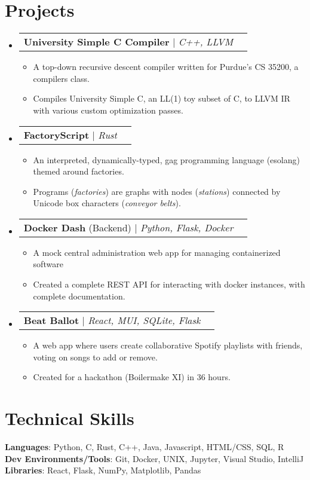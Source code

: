 \documentclass[letterpaper,11pt]{article}
\makeatletter
\newcommand{\resumeItem}[1]{
    \item\small{
        {#1 \vspace{-2pt}}
    }
}
\newcommand{\resumeProjectHeading}[1]{
    \item
    \begin{tabular*}{0.97\textwidth}{l@{\extracolsep{\fill}}r}
        \small#1 \\
    \end{tabular*}\vspace{-7pt}
}
\newcommand{\resumeSubHeadingListStart}{\begin{itemize}[leftmargin=0.15in, label={}]}
\newcommand{\resumeSubHeadingListEnd}{\end{itemize}}
\newcommand{\resumeItemListStart}{\begin{itemize}}
\newcommand{\resumeItemListEnd}{\end{itemize}\vspace{-5pt}}
\makeatother
\begin{document}
\section{Projects}
\resumeSubHeadingListStart
    \resumeProjectHeading
        {\textbf{University Simple C Compiler} $|$ \emph{C++, LLVM}}
        \resumeItemListStart
            \resumeItem{A top-down recursive descent compiler written for Purdue's CS 35200, a compilers class.}
            \resumeItem{Compiles University Simple C, an LL(1) toy subset of C, to LLVM IR with various custom optimization passes.}
        \resumeItemListEnd
    \resumeProjectHeading
        {\textbf{FactoryScript} $|$ \emph{Rust}}
        \resumeItemListStart
            \resumeItem{An interpreted, dynamically-typed, gag programming language  (esolang) themed around factories.}
            \resumeItem{Programs (\textit{factories}) are graphs with nodes (\textit{stations}) connected by Unicode box characters (\textit{conveyor belts}).}
        \resumeItemListEnd
    \resumeProjectHeading
        {\textbf{Docker Dash} (Backend) $|$ \emph{Python, Flask, Docker}}
        \resumeItemListStart
            \resumeItem{A mock central administration web app for managing containerized software}
            \resumeItem{Created a complete REST API for interacting with docker instances, with complete documentation.}
        \resumeItemListEnd
    \resumeProjectHeading
        {\textbf{Beat Ballot} $|$ \emph{React, MUI, SQLite, Flask}}
        \resumeItemListStart
            \resumeItem{A web app where users create collaborative Spotify playlists with friends, voting on songs to add or remove.}
            \resumeItem{Created for a hackathon (Boilermake XI) in 36 hours.}
        \resumeItemListEnd
    
\resumeSubHeadingListEnd



%
\section{Technical Skills}
 \begin{itemize}[leftmargin=0.15in, label={}]
    \small{\item{
     \textbf{Languages}{: Python, C, Rust, C++, Java, Javascript, HTML/CSS, SQL, R} \\
     \textbf{Dev Environments/Tools}{: Git, Docker, UNIX, Jupyter, Visual Studio, IntelliJ } \\
     \textbf{Libraries}{: React, Flask, NumPy, Matplotlib, Pandas}
    }}
 \end{itemize}


\end{document}
